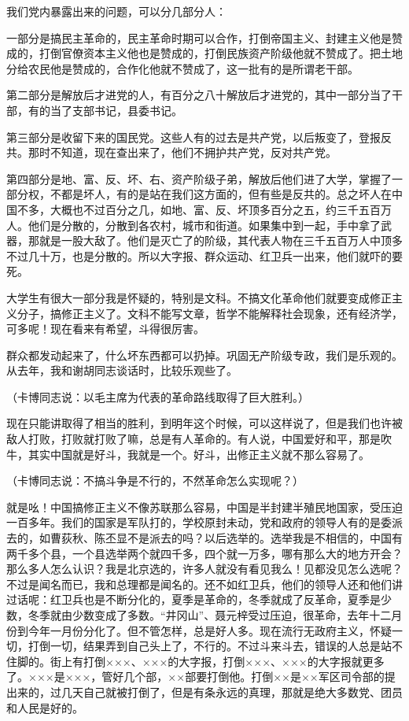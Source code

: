 我们党内暴露出来的问题，可以分几部分人：

一部分是搞民主革命的，民主革命时期可以合作，打倒帝国主义、封建主义他是赞成的，打倒官僚资本主义他也是赞成的，打倒民族资产阶级他就不赞成了。把土地分给农民他是赞成的，合作化他就不赞成了，这一批有的是所谓老干部。

第二部分是解放后才进党的人，有百分之八十解放后才进党的，其中一部分当了干部，有的当了支部书记，县委书记。

第三部分是收留下来的国民党。这些人有的过去是共产党，以后叛变了，登报反共。那时不知道，现在查出来了，他们不拥护共产党，反对共产党。

第四部分是地、富、反、坏、右、资产阶级子弟，解放后他们进了大学，掌握了一部分权，不都是坏人，有的是站在我们这方面的，但有些是反共的。总之坏人在中国不多，大概也不过百分之几，如地、富、反、坏顶多百分之五，约三千五百万人。他们是分散的，分散到各农村，城市和街道。如果集中到一起，手中拿了武器，那就是一股大敌了。他们是灭亡了的阶级，其代表人物在三千五百万人中顶多不过几十万，也是分散的。所以大字报、群众运动、红卫兵一出来，他们就吓的要死。

大学生有很大一部分我是怀疑的，特别是文科。不搞文化革命他们就要变成修正主义分子，搞修正主义了。文科不能写文章，哲学不能解释社会现象，还有经济学，可多呢！现在看来有希望，斗得很厉害。

群众都发动起来了，什么坏东西都可以扔掉。巩固无产阶级专政，我们是乐观的。从去年，我和谢胡同志谈话时，比较乐观些了。

（卡博同志说：以毛主席为代表的革命路线取得了巨大胜利。）

现在只能讲取得了相当的胜利，到明年这个时候，可以这样说了，但是我们也许被敌人打败，打败就打败了嘛，总是有人革命的。有人说，中国爱好和平，那是吹牛，其实中国就是好斗，我就是一个。好斗，出修正主义就不那么容易了。

（卡博同志说：不搞斗争是不行的，不然革命怎么实现呢？）

就是吆！中国搞修正主义不像苏联那么容易，中国是半封建半殖民地国家，受压迫一百多年。我们的国家是军队打的，学校原封未动，党和政府的领导人有的是委派去的，如曹荻秋、陈丕显不是派去的吗？以后选举的。选举我是不相信的，中国有两千多个县，一个县选举两个就四千多，四个就一万多，哪有那么大的地方开会？那么多人怎么认识？我是北京选的，许多人就没有看见我么！见都没见怎么选呢？不过是闻名而已，我和总理都是闻名的。还不如红卫兵，他们的领导人还和他们讲过话呢：红卫兵也是不断分化的，夏季是革命的，冬季就成了反革命，夏季是少数，冬季就由少数变成了多数。“井冈山”、聂元梓受过压迫，很革命，去年十二月份到今年一月份分化了。但不管怎样，总是好人多。现在流行无政府主义，怀疑一切，打倒一切，结果弄到自己头上了，不行的。不过斗来斗去，错误的人总是站不住脚的。街上有打倒×××、×××的大字报，打倒×××、×××的大字报就更多了。×××是×××，管好几个部，××部要打倒他。打倒××是××军区司令部的提出来的，过几天自己就被打倒了，但是有条永远的真理，那就是绝大多数党、团员和人民是好的。

